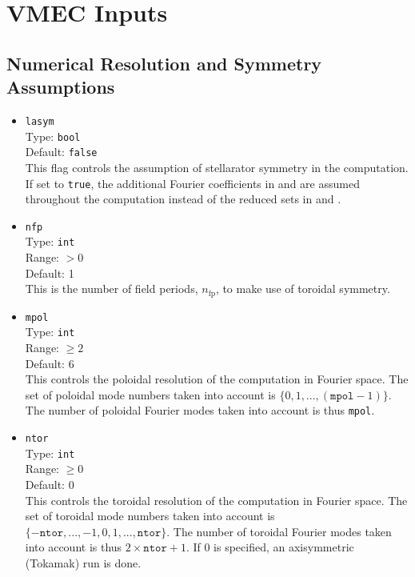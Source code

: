 \chapter{VMEC Inputs}

\section{Numerical Resolution and Symmetry Assumptions}

\begin{itemize}
 \item \texttt{lasym} \\
       Type: \texttt{bool} \\
       Default: \texttt{false} \\
       This flag controls the assumption of stellarator symmetry in the computation.
       If set to \texttt{true}, the additional Fourier coefficients in  and 
       are assumed throughout the computation instead of the reduced sets in  and .

 \item \texttt{nfp} \\
       Type: \texttt{int} \\
       Range: $>0$ \\
       Default: 1 \\
       This is the number of field periods, $n_\textrm{fp}$, to make use of toroidal symmetry.

 \item \texttt{mpol} \\
       Type: \texttt{int} \\
       Range: $\geq 2$ \\
       Default: 6 \\
       This controls the poloidal resolution of the computation in Fourier space.
       The set of poloidal mode numbers taken into account is
       $\{0, 1, ..., (\texttt{mpol} - 1)\}$.
       The number of poloidal Fourier modes taken into account is thus \texttt{mpol}.

 \item \texttt{ntor} \\
       Type: \texttt{int} \\
       Range: $\geq 0$ \\
       Default: 0 \\
       This controls the toroidal resolution of the computation in Fourier space.
       The set of toroidal mode numbers taken into account is
       $\{-\texttt{ntor}, ..., -1, 0, 1, ..., \texttt{ntor}\}$.
       The number of toroidal Fourier modes taken into account is thus $2 \times \texttt{ntor} + 1$.
       If $0$ is specified, an axisymmetric (Tokamak) run is done.


\end{itemize}
